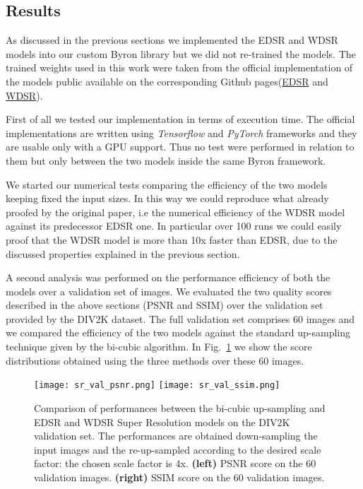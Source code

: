 \documentclass{standalone}
\begin{document}
\subsection[Results]{Results}\label{SR:results}

As discussed in the previous sections we implemented the EDSR and WDSR models into our custom \textsf{Byron} library but we did not re-trained the models.
The trained weights used in this work were taken from the official implementation of the models public available on the corresponding Github pages(\href{}{EDSR} and \href{}{WDSR}). %

First of all we tested our implementation in terms of execution time.
The official implementations are written using \emph{Tensorflow} and \emph{PyTorch} frameworks and they are usable only with a GPU support.
Thus no test were performed in relation to them but only between the two models inside the same \textsf{Byron} framework.

We started our numerical tests comparing the efficiency of the two models keeping fixed the input sizes.
In this way we could reproduce what already proofed by the original paper, i.e the numerical efficiency of the WDSR model against its predecessor EDSR one.
In particular over 100 runs we could easily proof that the WDSR model is more than 10x faster than EDSR, due to the discussed properties explained in the previous section.

A second analysis was performed on the performance efficiency of both the models over a validation set of images.
We evaluated the two quality scores described in the above sections (PSNR and SSIM) over the validation set provided by the DIV2K dataset.
The full validation set comprises 60 images and we compared the efficiency of the two models against the standard up-sampling technique given by the bi-cubic algorithm.
In Fig.~\ref{fig:sr_validation} we show the score distributions obtained using the three methods over these 60 images.

\begin{center}
\begin{figure}[htbp]
\centering
\texttt{[image: sr\_val\_psnr.png]}
\quad
\texttt{[image: sr\_val\_ssim.png]}
\caption{Comparison of performances between the bi-cubic up-sampling and EDSR and WDSR Super Resolution models on the DIV2K validation set.
The performances are obtained down-sampling the input images and the re-up-sampled according to the desired scale factor: the chosen scale factor is 4x.
\textbf{(left)} PSNR score on the 60 validation images.
\textbf{(right)} SSIM score on the 60 validation images.
}
\label{fig:sr_validation}
\end{figure}
\end{center}
\end{document}

